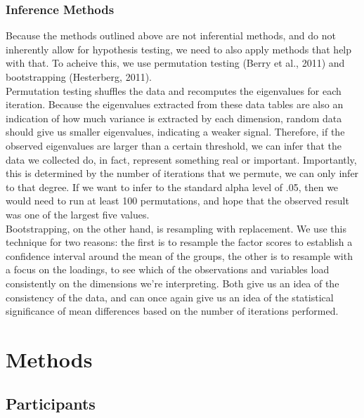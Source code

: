 \documentclass[
  english,
  man,floatsintext]{apa6}
\begin{document}
\hypertarget{inference-methods}{%
\subsubsection{Inference Methods}\label{inference-methods}}

Because the methods outlined above are not inferential methods, and do not inherently allow for hypothesis testing, we need to also apply methods that help with that. To acheive this, we use permutation testing (Berry et al., 2011) and bootstrapping (Hesterberg, 2011).\\
Permutation testing shuffles the data and recomputes the eigenvalues for each iteration. Because the eigenvalues extracted from these data tables are also an indication of how much variance is extracted by each dimension, random data should give us smaller eigenvalues, indicating a weaker signal. Therefore, if the observed eigenvalues are larger than a certain threshold, we can infer that the data we collected do, in fact, represent something real or important. Importantly, this is determined by the number of iterations that we permute, we can only infer to that degree. If we want to infer to the standard alpha level of .05, then we would need to run at least 100 permutations, and hope that the observed result was one of the largest five values.\\
Bootstrapping, on the other hand, is resampling with replacement. We use this technique for two reasons: the first is to resample the factor scores to establish a confidence interval around the mean of the groups, the other is to resample with a focus on the loadings, to see which of the observations and variables load consistently on the dimensions we're interpreting. Both give us an idea of the consistency of the data, and can once again give us an idea of the statistical significance of mean differences based on the number of iterations performed.

\hypertarget{methods}{%
\section{Methods}\label{methods}}

\hypertarget{participants}{%
\subsection{Participants}\label{participants}}
\end{document}

